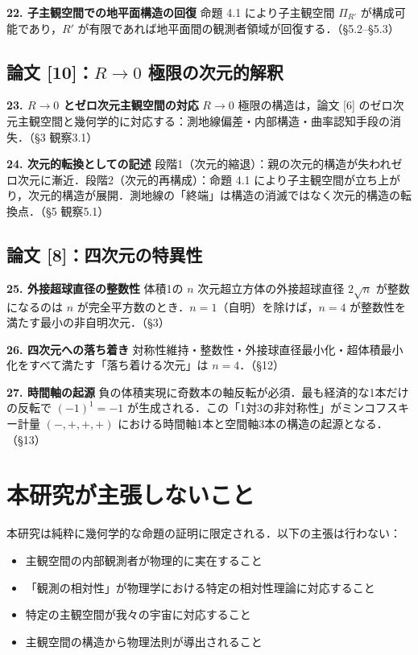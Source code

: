 \documentclass[12pt,a4paper]{ltjsarticle}
\begin{document}
\textbf{22. 子主観空間での地平面構造の回復}\quad
命題 4.1 により子主観空間 $\Pi_{R'}$ が構成可能であり，$R'$ が有限であれば地平面間の観測者領域が回復する．（\S 5.2--\S 5.3）

\subsection*{論文 [10]：$R \to 0$ 極限の次元的解釈}

\textbf{23. $R \to 0$ とゼロ次元主観空間の対応}\quad
$R \to 0$ 極限の構造は，論文 {[6]} のゼロ次元主観空間と幾何学的に対応する：測地線偏差・内部構造・曲率認知手段の消失．（\S 3 観察3.1）

\textbf{24. 次元的転換としての記述}\quad
段階1（次元的縮退）：親の次元的構造が失われゼロ次元に漸近．段階2（次元的再構成）：命題 4.1 により子主観空間が立ち上がり，次元的構造が展開．測地線の「終端」は構造の消滅ではなく次元的構造の転換点．（\S 5 観察5.1）

\subsection*{論文 [8]：四次元の特異性}

\textbf{25. 外接超球直径の整数性}\quad
体積1の $n$ 次元超立方体の外接超球直径 $2\sqrt{n}$ が整数になるのは $n$ が完全平方数のとき．$n = 1$（自明）を除けば，$n = 4$ が整数性を満たす最小の非自明次元．（\S 3）

\textbf{26. 四次元への落ち着き}\quad
対称性維持・整数性・外接球直径最小化・超体積最小化をすべて満たす「落ち着ける次元」は $n = 4$．（\S 12）

\textbf{27. 時間軸の起源}\quad
負の体積実現に奇数本の軸反転が必須．最も経済的な1本だけの反転で $(-1)^1 = -1$ が生成される．この「1対3の非対称性」がミンコフスキー計量 $(-,+,+,+)$ における時間軸1本と空間軸3本の構造の起源となる．（\S 13）

\section*{本研究が主張しないこと}

本研究は純粋に幾何学的な命題の証明に限定される．以下の主張は行わない：

\begin{itemize}
  \item 主観空間の内部観測者が物理的に実在すること
  \item 「観測の相対性」が物理学における特定の相対性理論に対応すること
  \item 特定の主観空間が我々の宇宙に対応すること
  \item 主観空間の構造から物理法則が導出されること
\end{itemize}
\end{document}
